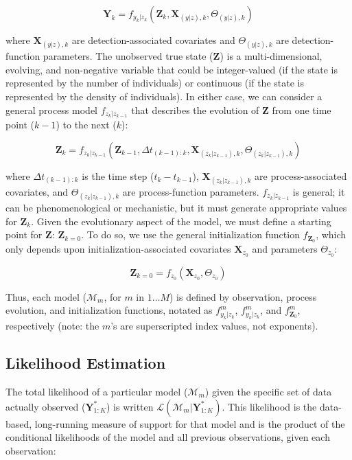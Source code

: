 \documentclass{article}
\begin{document}
\begin{equation}
\textbf{Y}_k = f_{y_k|z_k}(\textbf{Z}_k, \textbf{X}_{(y|z), k}, \Theta_{(y|z), k})
\end{equation}

where $\textbf{X}_{(y|z), k}$ are detection-associated covariates and $\Theta_{(y|z), k}$ are detection-function parameters. The unobserved true state ($\textbf{Z}$) is a multi-dimensional, evolving, and non-negative variable that could be integer-valued (if the state is represented by the number of individuals) or continuous (if the state is represented by the density of individuals). In either case, we can consider a general process model $f_{z_k|z_{k-1}}$ that describes the evolution of $\textbf{Z}$ from one time point ($k-1$) to the next ($k$):

\begin{equation}
\textbf{Z}_{k} = f_{z_k|z_{k-1}}(\textbf{Z}_{k-1}, \Delta t_{(k-1):k}, \textbf{X}_{(z_k|z_{k-1}), k},\Theta_{(z_k|z_{k-1}), k})
\end{equation}

where $\Delta t_{(k-1):k}$ is the time step ($t_k - t_{k-1}$), $\textbf{X}_{(z_k|z_{k-1}), k}$ are process-associated covariates, and $\Theta_{(z_k|z_{k-1}), k}$ are process-function parameters. $f_{z_k|z_{k-1}}$ is general; it can be phenomenological or mechanistic, but it must generate appropriate values for $\textbf{Z}_{k}$. Given the evolutionary aspect of the model, we must define a starting point for $\textbf{Z}$: $\textbf{Z}_{k=0}$. To do so, we use the general initialization function $f_{\textbf{Z}_0}$, which only depends upon initialization-associated covariates $\textbf{X}_{z_0}$ and parameters $\Theta_{z_0}$:

\begin{equation}
\textbf{Z}_{k=0} = f_{z_0}(\textbf{X}_{z_0}, \Theta_{z_0})
\end{equation}

Thus, each model ($\mathcal{M}_m$, for $m$ in $1 \ldots M$) is defined by observation, process evolution, and initialization functions, notated as $f^m_{y_k|z_k}$, $f^m_{y_k|z_k}$, and $f^m_{\textbf{Z}_0}$, respectively (note: the $m$'s are superscripted index values, not exponents). 

\subsection{Likelihood Estimation}
\label{subsec:devmods_le}

The total likelihood of a particular model ($\mathcal{M}_m$) given the specific set of data actually observed ($\textbf{Y}^{*}_{1:K}$) is written $\mathcal{L}(\mathcal{M}_m|\textbf{Y}^{*}_{1:K})$. This likelihood is the data-based, long-running measure of support for that model and is the product of the conditional likelihoods of the model and all previous observations, given each observation:
\end{document}
